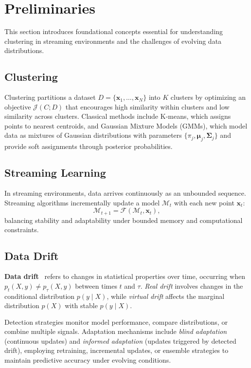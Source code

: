 \section{Preliminaries}\label{sec:preliminaries}

This section introduces foundational concepts essential for understanding
clustering in streaming environments and the challenges of evolving data
distributions.

\subsection{Clustering}\label{subsec:clustering}

Clustering partitions a dataset $D = \{\mathbf{x}_1, \dots, \mathbf{x}_N\}$
into $K$ clusters by optimizing an objective $\mathcal{J}(C; D)$ that
encourages high similarity within clusters and low similarity across clusters.
Classical methods include K-means, which assigns points to nearest centroids,
and Gaussian Mixture Models (GMMs), which model data as mixtures of Gaussian
distributions with parameters $\{\pi_j, \boldsymbol{\mu}_j,
    \mathbf{\Sigma}_j\}$ and provide soft assignments through posterior
probabilities.

\subsection{Streaming Learning}\label{subsec:streaming_learning}

In streaming environments, data arrives continuously as an unbounded sequence.
Streaming algorithms incrementally update a model $\mathcal{M}_t$ with each new
point $\mathbf{x}_t$:
\[
    \mathcal{M}_{t+1} = \mathcal{F}(\mathcal{M}_t, \mathbf{x}_t),
\]
balancing stability and adaptability under bounded memory and computational
constraints.

\subsection{Data Drift}\label{subsec:data_drift}

\textbf{Data drift}~\cite{drift_adaptation_survey} refers to changes in statistical properties over time, occurring when $p_t(X, y) \neq p_\tau(X, y)$ between times $t$ and $\tau$. \emph{Real drift} involves changes in the conditional distribution $p(y \mid X)$, while \emph{virtual drift} affects the marginal distribution $p(X)$ with stable $p(y \mid X)$.

Detection strategies monitor model performance, compare
distributions, or combine multiple signals. Adaptation mechanisms include
\emph{blind adaptation} (continuous updates) and \emph{informed adaptation}
(updates triggered by detected drift), employing retraining, incremental
updates, or ensemble strategies to maintain predictive accuracy under evolving
conditions.

